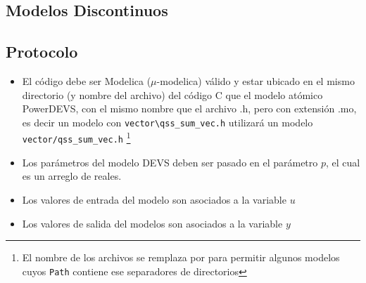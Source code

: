 \documentclass{beamer}
\begin{document}
\subsection{Modelos Discontinuos}

\subsection{Protocolo}
\begin{frame}[fragile]
\begin{itemize}
        \item El código debe ser Modelica ($\mu$-modelica) válido y estar ubicado en el mismo directorio (y nombre del archivo) del código C que el modelo atómico 
        PowerDEVS, con el mismo nombre que el archivo .h, pero con extensión .mo, es decir un modelo con \texttt{vector\textbackslash qss\_sum\_vec.h} 
	utilizará un modelo \texttt{vector/qss\_sum\_vec.h} \footnote{El nombre de los archivos se remplaza \quotes{\textbackslash} por \quotes{/} para permitir 
	algunos modelos cuyos \texttt{Path} contiene ese separadores de directorios}
        \item Los parámetros del modelo DEVS deben ser pasado en el parámetro $p$, el cual es un arreglo de reales. 
        \item Los valores de entrada del modelo son asociados a la variable $u$
        \item Los valores de salida del modelos son asociados a la variable $y$
\end{itemize}
\end{frame}

\end{document}
